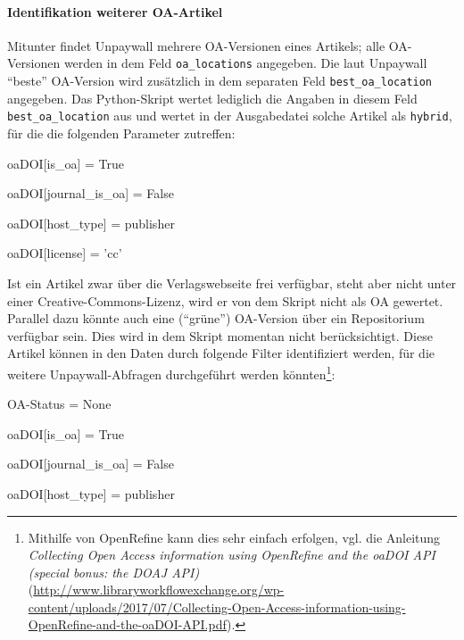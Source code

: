 \paragraph{Identifikation weiterer OA-Artikel} Mitunter findet Unpaywall mehrere OA-Versionen eines Artikels; alle OA-Versionen werden in dem Feld \texttt{oa\_locations} angegeben. Die laut Unpaywall "`beste"' OA-Version wird zusätzlich in dem separaten Feld \texttt{best\_oa\_location} angegeben. Das Python-Skript wertet lediglich die Angaben in diesem Feld \texttt{best\_oa\_location} aus und wertet in der Ausgabedatei solche Artikel als \texttt{hybrid}, für die die folgenden Parameter zutreffen:
\begin{ttfamily}
\begin{compactitem}
\item oaDOI[is\_oa] = True
\item oaDOI[journal\_is\_oa] = False
\item oaDOI[host\_type] = publisher
\item oaDOI[license] = 'cc'
\end{compactitem}
\end{ttfamily}
Ist ein Artikel zwar über die Verlagswebseite frei verfügbar, steht aber nicht unter einer Creative-Commons-Lizenz, wird er von dem Skript nicht als OA gewertet. Parallel dazu könnte auch eine ("`grüne"') OA-Version über ein Repositorium verfügbar sein. Dies wird in dem Skript momentan nicht berücksichtigt. Diese Artikel können in den Daten durch folgende Filter identifiziert werden, für die weitere Unpaywall-Abfragen durchgeführt werden könnten\footnote{Mithilfe von OpenRefine kann dies sehr einfach erfolgen, vgl. die Anleitung \textit{Collecting Open Access information using OpenRefine and the
oaDOI API (special bonus: the DOAJ API)} (\url{http://www.libraryworkflowexchange.org/wp-content/uploads/2017/07/Collecting-Open-Access-information-using-OpenRefine-and-the-oaDOI-API.pdf}).}:

\begin{ttfamily}
\begin{compactitem}
\item OA-Status = None
\item oaDOI[is\_oa] = True
\item oaDOI[journal\_is\_oa] = False
\item oaDOI[host\_type] = publisher
\end{compactitem}
\end{ttfamily}

